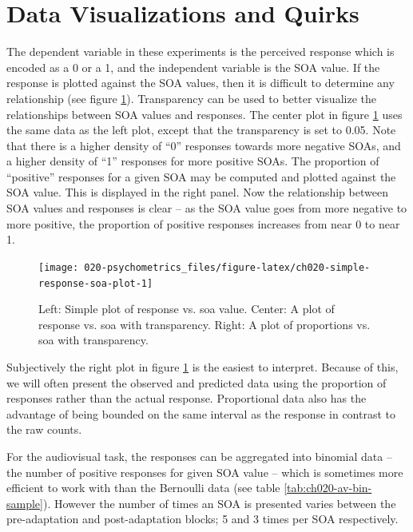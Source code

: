\documentclass[11pt, oneside, openany]{scrbook}
\begin{document}
\hypertarget{data-visualizations-and-quirks}{%
\section{Data Visualizations and Quirks}\label{data-visualizations-and-quirks}}

The dependent variable in these experiments is the perceived response which is encoded as a 0 or a 1, and the independent variable is the SOA value. If the response is plotted against the SOA values, then it is difficult to determine any relationship (see figure \ref{fig:ch020-simple-response-soa-plot}). Transparency can be used to better visualize the relationships between SOA values and responses. The center plot in figure \ref{fig:ch020-simple-response-soa-plot} uses the same data as the left plot, except that the transparency is set to 0.05. Note that there is a higher density of ``0'' responses towards more negative SOAs, and a higher density of ``1'' responses for more positive SOAs. The proportion of ``positive'' responses for a given SOA may be computed and plotted against the SOA value. This is displayed in the right panel. Now the relationship between SOA values and responses is clear -- as the SOA value goes from more negative to more positive, the proportion of positive responses increases from near 0 to near 1.

\begin{figure}

{\centering \texttt{[image: 020-psychometrics\_files/figure-latex/ch020-simple-response-soa-plot-1]} 

}

\caption{Left: Simple plot of response vs. soa value. Center: A plot of response vs. soa with transparency. Right: A plot of proportions vs. soa with transparency.}\label{fig:ch020-simple-response-soa-plot}
\end{figure}

Subjectively the right plot in figure \ref{fig:ch020-simple-response-soa-plot} is the easiest to interpret. Because of this, we will often present the observed and predicted data using the proportion of responses rather than the actual response. Proportional data also has the advantage of being bounded on the same interval as the response in contrast to the raw counts.

For the audiovisual task, the responses can be aggregated into binomial data -- the number of positive responses for given SOA value -- which is sometimes more efficient to work with than the Bernoulli data (see table \ref{tab:ch020-av-bin-sample}). However the number of times an SOA is presented varies between the pre-adaptation and post-adaptation blocks; 5 and 3 times per SOA respectively.
\end{document}
